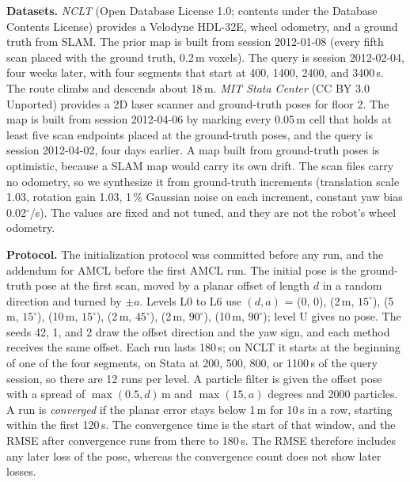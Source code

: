 \noindent\textbf{Datasets.} \emph{NCLT} \citep{carlevarisbianco2016nclt} (Open Database License 1.0; contents under the Database Contents License) provides a Velodyne HDL-32E, wheel odometry, and a ground truth from SLAM. The prior map is built from session 2012-01-08 (every fifth scan placed with the ground truth, 0.2\,m voxels). The query is session 2012-02-04, four weeks later, with four segments that start at 400, 1400, 2400, and 3400\,s. The route climbs and descends about 18\,m. \emph{MIT Stata Center} \citep{fallon2013stata} (CC BY 3.0 Unported) provides a 2D laser scanner and ground-truth poses for floor 2. The map is built from session 2012-04-06 by marking every 0.05\,m cell that holds at least five scan endpoints placed at the ground-truth poses, and the query is session 2012-04-02, four days earlier. A map built from ground-truth poses is optimistic, because a SLAM map would carry its own drift. The scan files carry no odometry, so we synthesize it from ground-truth increments (translation scale 1.03, rotation gain 1.03, 1\,\% Gaussian noise on each increment, constant yaw bias 0.02$^\circ$/s). The values are fixed and not tuned, and they are not the robot's wheel odometry.

\noindent\textbf{Protocol.} The initialization protocol was committed before any run, and the addendum for AMCL before the first AMCL run. The initial pose is the ground-truth pose at the first scan, moved by a planar offset of length $d$ in a random direction and turned by $\pm a$. Levels L0 to L6 use $(d,a)$ = (0, 0), (2\,m, $15^\circ$), (5\,m, $15^\circ$), (10\,m, $15^\circ$), (2\,m, $45^\circ$), (2\,m, $90^\circ$), (10\,m, $90^\circ$); level U gives no pose. The seeds 42, 1, and 2 draw the offset direction and the yaw sign, and each method receives the same offset. Each run lasts 180\,s; on NCLT it starts at the beginning of one of the four segments, on Stata at 200, 500, 800, or 1100\,s of the query session, so there are 12 runs per level. A particle filter is given the offset pose with a spread of $\max(0.5,d)$\,m and $\max(15,a)$ degrees and 2000 particles. A run is \emph{converged} if the planar error stays below 1\,m for 10\,s in a row, starting within the first 120\,s. The convergence time is the start of that window, and the RMSE after convergence runs from there to 180\,s. The RMSE therefore includes any later loss of the pose, whereas the convergence count does not show later losses.

